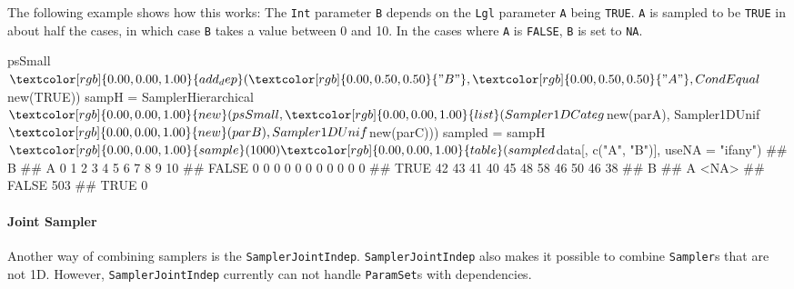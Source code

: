\documentclass[12pt,]{scrbook}
\newenvironment{Shaded}{}{}
\newcommand{\DataTypeTok}[1]{#1}
\newcommand{\DecValTok}[1]{#1}
\newcommand{\KeywordTok}[1]{\textcolor[rgb]{0.00,0.00,1.00}{#1}}
\newcommand{\NormalTok}[1]{#1}
\newcommand{\OperatorTok}[1]{#1}
\newcommand{\OtherTok}[1]{\textcolor[rgb]{1.00,0.25,0.00}{#1}}
\newcommand{\StringTok}[1]{\textcolor[rgb]{0.00,0.50,0.50}{#1}}
\let\oldparagraph\paragraph
\renewcommand{\paragraph}[1]{\oldparagraph{#1}\mbox{}}
\begin{document}
The following example shows how this works: The \texttt{Int} parameter \texttt{B} depends on the \texttt{Lgl} parameter \texttt{A} being \texttt{TRUE}.
\texttt{A} is sampled to be \texttt{TRUE} in about half the cases, in which case \texttt{B} takes a value between 0 and 10.
In the cases where \texttt{A} is \texttt{FALSE}, \texttt{B} is set to \texttt{NA}.

\begin{Shaded}
\begin{Highlighting}[]
\NormalTok{psSmall}\OperatorTok{$}\KeywordTok{add_dep}\NormalTok{(}\StringTok{"B"}\NormalTok{, }\StringTok{"A"}\NormalTok{, CondEqual}\OperatorTok{$}\KeywordTok{new}\NormalTok{(}\OtherTok{TRUE}\NormalTok{))}
\NormalTok{sampH =}\StringTok{ }\NormalTok{SamplerHierarchical}\OperatorTok{$}\KeywordTok{new}\NormalTok{(psSmall, }\KeywordTok{list}\NormalTok{(Sampler1DCateg}\OperatorTok{$}\KeywordTok{new}\NormalTok{(parA), }
\NormalTok{  Sampler1DUnif}\OperatorTok{$}\KeywordTok{new}\NormalTok{(parB), Sampler1DUnif}\OperatorTok{$}\KeywordTok{new}\NormalTok{(parC)))}
\NormalTok{sampled =}\StringTok{ }\NormalTok{sampH}\OperatorTok{$}\KeywordTok{sample}\NormalTok{(}\DecValTok{1000}\NormalTok{)}
\KeywordTok{table}\NormalTok{(sampled}\OperatorTok{$}\NormalTok{data[, }\KeywordTok{c}\NormalTok{(}\StringTok{"A"}\NormalTok{, }\StringTok{"B"}\NormalTok{)], }\DataTypeTok{useNA =} \StringTok{"ifany"}\NormalTok{)}
\NormalTok{##        B}
\NormalTok{## A         0   1   2   3   4   5   6   7   8   9  10}
\NormalTok{##   FALSE   0   0   0   0   0   0   0   0   0   0   0}
\NormalTok{##   TRUE   42  43  41  40  45  48  58  46  50  46  38}
\NormalTok{##        B}
\NormalTok{## A       <NA>}
\NormalTok{##   FALSE  503}
\NormalTok{##   TRUE     0}
\end{Highlighting}
\end{Shaded}

\hypertarget{joint-sampler}{%
\paragraph{Joint Sampler}\label{joint-sampler}}

Another way of combining samplers is the \texttt{SamplerJointIndep}.
\texttt{SamplerJointIndep} also makes it possible to combine \texttt{Sampler}s that are not 1D.
However, \texttt{SamplerJointIndep} currently can not handle \texttt{ParamSet}s with dependencies.
\end{document}
